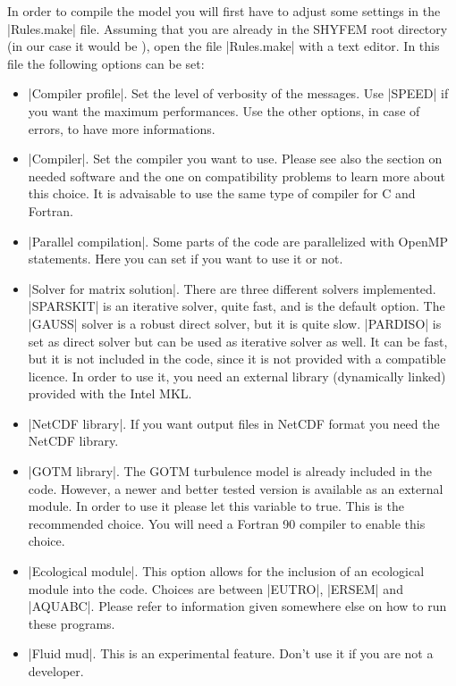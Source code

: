 
In order to compile the model you will first have to adjust some settings
in the |Rules.make| file. Assuming that you are already in the SHYFEM
root directory (in our case it would be \ttt{\shydir}), open the file
|Rules.make| with a text editor.  In this file the following options
can be set:

\begin{itemize}

\item |Compiler profile|. Set the level of verbosity of the messages. Use
|SPEED| if you want the maximum performances. Use the other options, in
case of errors, to have more informations.

\item |Compiler|. Set the compiler you want to use. Please see also
the section on needed software and the one on compatibility problems to
learn more about this choice. It is advaisable to use the same type of
compiler for C and Fortran.

\item |Parallel compilation|. Some parts of the code are parallelized
with OpenMP statements. Here you can set if you want to use it or not.

\item |Solver for matrix solution|. There are three
different solvers implemented. |SPARSKIT| is an iterative solver, 
quite fast, and is the default option.
The |GAUSS| solver is a robust direct solver, but it is quite slow. 
|PARDISO| is set as direct solver but can be used as iterative
solver as well. It can be fast, but it is not included in the code,
since it is not provided with a compatible licence. In order to
use it, you need an external library (dynamically linked) provided 
with the Intel MKL.

\item |NetCDF library|. If you want output files in NetCDF format
you need the NetCDF library.

\item |GOTM library|. The GOTM turbulence model is already included in
the code. However, a newer and better tested version is available as an
external module. In order to use it please let this variable to true. This
is the recommended choice. You will need a Fortran 90 compiler to enable
this choice.

\item |Ecological module|. This option allows for the inclusion of an
ecological module into the code. Choices are between |EUTRO|, |ERSEM|
and |AQUABC|. Please refer to information given somewhere else on how
to run these programs.

\item |Fluid mud|. This is an experimental feature. Don't use it
if you are not a developer.

\end{itemize}

